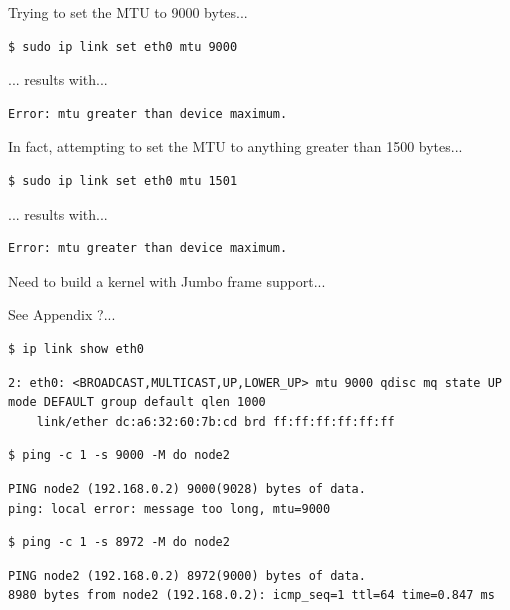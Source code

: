 \documentclass{report}
\begin{document}
Trying to set the MTU to 9000 bytes...

\lstset{style=type}
\begin{lstlisting}
$ sudo ip link set eth0 mtu 9000 
\end{lstlisting}

... results with...

\lstset{style=type}
\begin{lstlisting}
Error: mtu greater than device maximum.
\end{lstlisting}

In fact, attempting to set the MTU to anything greater than 1500 bytes...

\lstset{style=type}
\begin{lstlisting}
$ sudo ip link set eth0 mtu 1501 
\end{lstlisting}

... results with...

\lstset{style=type}
\begin{lstlisting}
Error: mtu greater than device maximum.
\end{lstlisting}


Need to build a kernel with Jumbo frame support...

See Appendix ?...

\lstset{style=type}
\begin{lstlisting}
$ ip link show eth0
\end{lstlisting}

\lstset{style=type}
\begin{lstlisting}
2: eth0: <BROADCAST,MULTICAST,UP,LOWER_UP> mtu 9000 qdisc mq state UP mode DEFAULT group default qlen 1000
    link/ether dc:a6:32:60:7b:cd brd ff:ff:ff:ff:ff:ff
\end{lstlisting}

\lstset{style=type}
\begin{lstlisting}
$ ping -c 1 -s 9000 -M do node2
\end{lstlisting}

\lstset{style=type}
\begin{lstlisting}
PING node2 (192.168.0.2) 9000(9028) bytes of data.
ping: local error: message too long, mtu=9000
\end{lstlisting}

\lstset{style=type}
\begin{lstlisting}
$ ping -c 1 -s 8972 -M do node2
\end{lstlisting}

\lstset{style=type}
\begin{lstlisting}
PING node2 (192.168.0.2) 8972(9000) bytes of data.
8980 bytes from node2 (192.168.0.2): icmp_seq=1 ttl=64 time=0.847 ms
\end{lstlisting}
\end{document}
